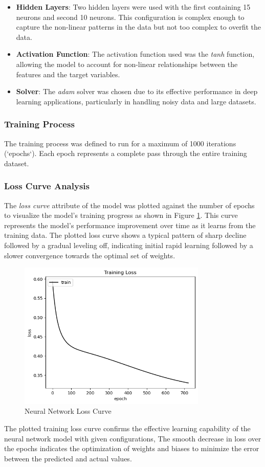 \begin{itemize}
    \item \textbf{Hidden Layers}: Two hidden layers were used with the first containing 15 neurons and second 10 neurons. This configuration is complex enough to capture the non-linear patterns in the data but
    not too complex to overfit the data. 
    \item \textbf{Activation Function}: The activation function used was the \textit{tanh} function, allowing the model to account for non-linear relationships between the features and the target variables.
    \item \textbf{Solver}: The \textit{adam} solver was chosen due to its effective performance in deep learning applications, particularly in handling noisy data and large datasets.
\end{itemize}

\subsubsection*{Training Process} The training process was defined to run for a maximum of 1000 iterations (`epochs`). Each epoch represents a complete pass through the entire training dataset.

\subsubsection*{Loss Curve Analysis} The \textit{loss curve} attribute of the model was plotted against the number of epochs to visualize the model's training progress as shown in Figure 
\ref{fig:neural_network_loss_curve}. This curve represents the model's performance improvement over time as it learns from the training data. The plotted loss curve shows a typical pattern
of sharp decline followed by a gradual leveling off, indicating initial rapid learning followed by a slower convergence towards the optimal set of weights.

\begin{figure}[H]
    \centering
    \includegraphics[width=0.8\textwidth]{images/nnCharts/neural_network_loss_curve.png}
    \caption{Neural Network Loss Curve}
    \label{fig:neural_network_loss_curve}
\end{figure}

The plotted training loss curve confirms the effective learning capability of the neural network model with given configurations, The smooth decrease in loss over the epochs indicates 
the optimization of weights and biases to minimize the error between the predicted and actual values.

